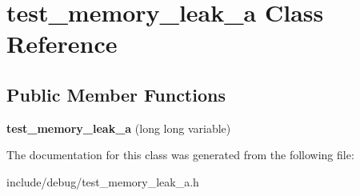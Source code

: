 \hypertarget{classtest__memory__leak__a}{\section{test\-\_\-memory\-\_\-leak\-\_\-a Class Reference}
\label{classtest__memory__leak__a}
}
\subsection*{Public Member Functions}
\begin{DoxyCompactItemize}
\item 
\hypertarget{classtest__memory__leak__a_a5c2926b9858b80567250e044a9f47c51}{{\bfseries test\-\_\-memory\-\_\-leak\-\_\-a} (long long variable)}\label{classtest__memory__leak__a_a5c2926b9858b80567250e044a9f47c51}

\end{DoxyCompactItemize}


The documentation for this class was generated from the following file\-:\begin{DoxyCompactItemize}
\item 
include/debug/test\-\_\-memory\-\_\-leak\-\_\-a.\-h\end{DoxyCompactItemize}
